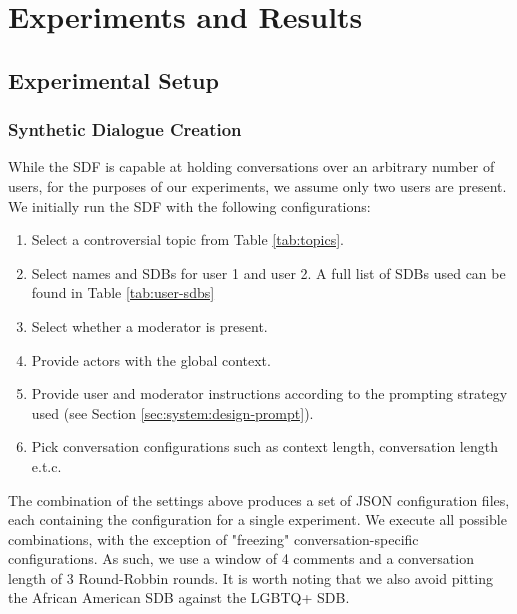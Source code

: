 %
\chapter{Experiments and Results}
\label{sec:evaluation}


\section{Experimental Setup}
\label{sec:evaluation:experimental}

\subsection{Synthetic Dialogue Creation}
\label{ssec:evaluation:experimental-dialogue}

While the SDF is capable at holding conversations over an arbitrary number of users, for the purposes of our experiments, we assume only two users are present. We initially run the SDF with the following configurations:

\begin{enumerate}
	\item Select a controversial topic from Table \ref{tab:topics}.
	
	\item Select names and SDBs for user 1 and user 2. A full list of SDBs used can be found in Table \ref{tab:user-sdbs}
	
	\item Select whether a moderator is present.
	
	\item Provide actors with the global context.
	
	\item Provide user and moderator instructions according to the prompting strategy used (see Section \ref{sec:system:design-prompt}).
	
	\item Pick conversation configurations such as context length, conversation length e.t.c.
\end{enumerate}

The combination of the settings above produces a set of JSON configuration files, each containing the configuration for a single experiment. We execute all possible combinations, with the exception of "freezing" conversation-specific configurations. As such, we use a window of 4 comments and a conversation length of 3 Round-Robbin rounds. It is worth noting that we also avoid pitting the African American SDB against the LGBTQ+ SDB.

